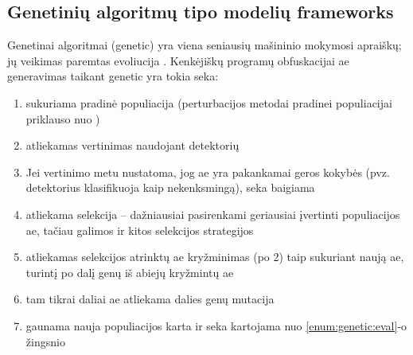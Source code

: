 \subsection{Genetinių algoritmų tipo modelių \glspl{framework}}\label{sec:literature:genetic}

Genetinai algoritmai (\acs{genetic}) yra viena seniausių mašininio mokymosi apraiškų; jų veikimas paremtas evoliucija \citeplace. Kenkėjiškų programų obfuskacijai \acs{ae} generavimas taikant \acs{genetic} yra tokia seka:
\begin{enumerate}
    \item sukuriama pradinė populiacija (perturbacijos metodai pradinei populiacijai priklauso nuo )
    \item atliekamas vertinimas naudojant detektorių\label{enum:genetic:eval}
    \item Jei vertinimo metu nustatoma, jog \acs{ae} yra pakankamai geros kokybės (pvz. detektorius klasifikuoja kaip nekenksmingą), seka baigiama
    \item atliekama selekcija -- dažniausiai pasirenkami geriausiai įvertinti populiacijos \acs{ae}, tačiau galimos ir kitos selekcijos strategijos
    \item atliekamas selekcijos atrinktų \acs{ae} kryžminimas (po 2) taip sukuriant naują \acs{ae}, turintį po dalį genų iš abiejų kryžmintų \acs{ae}
    \item tam tikrai daliai \ac{ae} atliekama dalies genų mutacija
    \item gaunama nauja populiacijos karta ir seka kartojama nuo \ref{enum:genetic:eval}-o žingsnio
\end{enumerate}
\cite{yusteOptimizationCodeCaves2022}